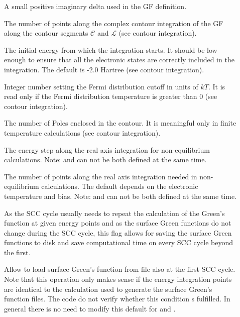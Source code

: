 \begin{description}
\item[] A small
  positive imaginary delta used in the GF definition.
  \item[] The number of points along the complex contour
    integration of the GF along the contour segments $\mathcal{C}$ and
    $\mathcal{L}$ (see contour integration).
\item[] The
  initial energy from which the integration starts. It should be low enough to
  ensure that all the electronic states are correctly included in the
  integration. The default is -2.0 Hartree (see contour integration).
\item[] Integer number setting the Fermi distribution cutoff in
  units of $kT$. It is read only if the Fermi distribution temperature is
  greater than 0 (see contour integration).
\item[] The number of Poles enclosed in the contour. It is
  meaningful only in finite temperature calculations (see contour integration).
\item[] The energy step along the real
  axis integration for non-equilibrium calculations. Note:  and
   can not be both defined at the same time.
 
  \item[] The number of points along the real axis
    integration needed in non-equilibrium calculations. The default depends on
    the electronic temperature and bias. Note:  and
     can not be both defined at the same time.
 
\item[] As the SCC cycle usually needs to repeat the
  calculation of the Green's function at given energy points and as the surface
  Green functions do not change during the SCC cycle, this flag allows for
  saving the surface Green functions to disk and save computational time on
  every SCC cycle beyond the first.

\item[] Allow to load surface Green's function from file also
  at the first SCC cycle. Note that this operation only makes sense if the
  energy integration points are identical to the calculation used to generate
  the surface Green's function files. The code do not verify whether this
  condition s fulfilled. In general there is no need to modify this default for
   and .


\end{description}
